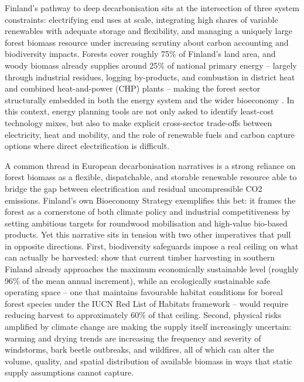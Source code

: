 \documentclass{article}
\begin{document}
Finland's pathway to deep decarbonisation sits at the intersection of three system constraints: electrifying end uses at scale, integrating high shares of variable renewables with adequate storage and flexibility, and managing a uniquely large forest biomass resource under increasing scrutiny about carbon accounting and biodiversity impacts. Forests cover roughly 75\% of Finland's land area, and woody biomass already supplies around 25\% of national primary energy -- largely through industrial residues, logging by-products, and combustion in district heat and combined heat-and-power (CHP) plants -- making the forest sector structurally embedded in both the energy system and the wider bioeconomy \citep{blattertSectoralPoliciesCause2022}. In this context, energy planning tools are not only asked to identify least-cost technology mixes, but also to make explicit cross-sector trade-offs between electricity, heat and mobility, and the role of renewable fuels and carbon capture options where direct electrification is difficult.

A common thread in European decarbonisation narratives is a strong reliance on forest biomass as a flexible, dispatchable, and storable renewable resource able to bridge the gap between electrification and residual uncompressible CO2 emissions. Finland's own Bioeconomy Strategy exemplifies this bet: it frames the forest as a cornerstone of both climate policy and industrial competitiveness by setting ambitious targets for roundwood mobilisation and high-value bio-based products. Yet this narrative sits in tension with two other imperatives that pull in opposite directions. First, biodiversity safeguards impose a real ceiling on what can actually be harvested: \citet{monkkonenEcologicallyEconomicallySustainable2024} show that current timber harvesting in southern Finland already approaches the maximum economically sustainable level (roughly 96\% of the mean annual increment), while an ecologically sustainable safe operating space -- one that maintains favourable habitat conditions for boreal forest species under the IUCN Red List of Habitats framework -- would require reducing harvest to approximately 60\% of that ceiling. Second, physical risks amplified by climate change are making the supply itself increasingly uncertain: warming and drying trends are increasing the frequency and severity of windstorms, bark beetle outbreaks, and wildfires, all of which can alter the volume, quality, and spatial distribution of available biomass in ways that static supply assumptions cannot capture.
\end{document}
